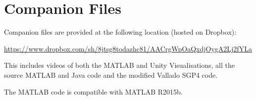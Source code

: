 \documentclass[12pt,openany,a4paper]{book}
\begin{document}
	\chapter{Companion Files}
	
	Companion files are provided at the following location (hosted on Dropbox): \newline
	
	\url{https://www.dropbox.com/sh/8jtsg8todazhc81/AACrgWpOaQxdjOygA2Lj2fYLa} \newline
	
	This includes videos of both the MATLAB and Unity Visualisations, all the source MATLAB and Java code and the modified Vallado SGP4 code. \newline
	
	The MATLAB code is compatible with MATLAB R2015b. 
	

	
%	
	
	\clearpage
	
\end{document}
